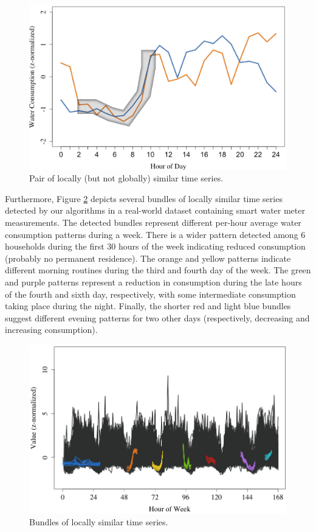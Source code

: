 \begin{figure}[tb]
    \centering
    \includegraphics[width=0.9\columnwidth]{figures/water_real_ex.png}
    \caption{Pair of locally (but not globally) similar time series.} 
    \label{fig:water_real_ex}
\end{figure}


Furthermore, Figure \ref{fig:bundles_water} depicts several bundles of locally similar time series detected by our algorithms in a real-world dataset containing smart water meter measurements. The detected bundles represent different per-hour average water consumption patterns during a week. There is a wider pattern detected among 6 households during the first 30 hours of the week indicating reduced consumption (probably no permanent residence). The orange and yellow patterns indicate different morning routines during the third and fourth day of the week. The green and purple patterns represent a reduction in consumption during the late hours of the fourth and sixth day, respectively, with some intermediate consumption taking place during the night. Finally, the shorter red and light blue bundles suggest different evening patterns for two other days (respectively, decreasing and increasing consumption).

\begin{figure}[tb]
    \centering
    \includegraphics[width=0.85\columnwidth]{figures/bundles_water.png}
    \caption{Bundles of locally similar time series.}
    \label{fig:bundles_water}
\end{figure}


